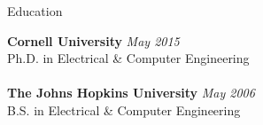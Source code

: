 \documentclass{resume} %
\begin{document}

\begin{rSection}{Education}

{\bf Cornell University} \hfill {\em May 2015} \\ 
Ph.D. in Electrical \& Computer Engineering \\
\smallskip \\
{\bf The Johns Hopkins University} \hfill {\em May 2006} \\ 
B.S. in Electrical \& Computer Engineering \\
\end{rSection}

\end{document}

